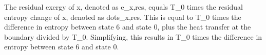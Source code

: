 The residual exergy of x, denoted as e_{x,res}, equals T_0 times the residual entropy change of x, denoted as dot{s}_{x,res}. This is equal to T_0 times the difference in entropy between state 6 and state 0, plus the heat transfer at the boundary divided by T_0. Simplifying, this results in T_0 times the difference in entropy between state 6 and state 0.